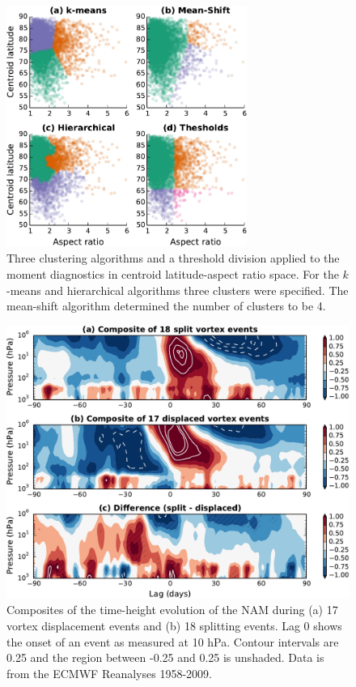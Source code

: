\begin{figure}
 \centering
 \noindent\includegraphics[width=0.7\textwidth]{figures/chapter-moments/clustering.pdf}
 \caption[Clustering algorithms applied to the moment diagnostics.]{Three
   clustering algorithms and a threshold division applied to the moment
   diagnostics in centroid latitude-aspect ratio space. For the $k$-means and
   hierarchical algorithms three clusters were specified. The mean-shift
   algorithm determined the number of clusters to be 4.}
 \label{fig:clusters}
\end{figure}


\begin{figure}
 \centering
 \noindent\includegraphics[width=\textwidth]{figures/chapter-moments/dripping_paint_crop.pdf}
 \caption[NAM composites for split and displaced vortex events.]{Composites of
   the time-height evolution of the NAM during (a) 17 vortex displacement events
   and (b) 18 splitting events. Lag 0 shows the onset of an event as measured at
   10 hPa. Contour intervals are 0.25 and the region between -0.25 and 0.25 is
   unshaded. Data is from the ECMWF Reanalyses 1958-2009.}
 \label{Fig3}
\end{figure}

